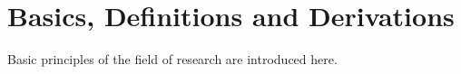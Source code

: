 \chapter{Basics, Definitions and Derivations}\label{ch:ch2}

Basic principles of the field of research are introduced here.